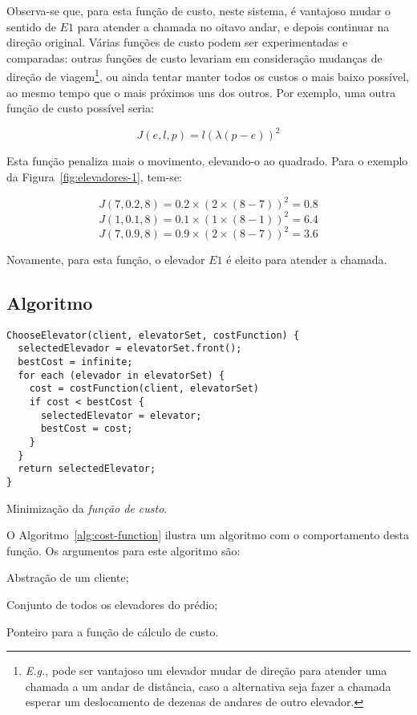 Observa-se que, para esta função de custo, neste sistema, é vantajoso mudar o
sentido de $E1$ para atender a chamada no oitavo andar, e depois continuar na
direção original. Várias funções de custo podem ser experimentadas e comparadas:
outras funções de custo levariam em consideração mudanças de direção de
viagem\footnote{\textit{E.g.}, pode ser vantajoso um elevador mudar de direção
para atender uma chamada a um andar de distância, caso a alternativa seja fazer a
chamada esperar um deslocamento de dezenas de andares de outro elevador.}, ou
ainda tentar manter todos os custos o mais baixo possível, ao mesmo tempo que o
mais próximos uns dos outros. Por exemplo, uma outra função de custo possível
seria:

\[J(e, l, p) = l(\lambda(p - e))^{2}\]

Esta função penaliza mais o movimento, elevando-o ao quadrado. Para o exemplo da
Figura~\ref{fig:elevadores-1}, tem-se:

\[J(7, 0.2, 8) = 0.2 \times (2 \times (8-7))^2 = 0.8\]
\[J(1, 0.1, 8) = 0.1 \times (1 \times (8-1))^2 = 6.4\]
\[J(7, 0.9, 8) = 0.9 \times (2 \times (8-7))^2 = 3.6\]

Novamente, para esta função, o elevador $E1$ é eleito para atender a chamada.

\subsection{Algoritmo}

\begin{algorithm}[htb!]
  \centering
    \begin{verbatim}
ChooseElevator(client, elevatorSet, costFunction) {
  selectedElevador = elevatorSet.front();
  bestCost = infinite;
  for each (elevador in elevatorSet) {
    cost = costFunction(client, elevatorSet)
    if cost < bestCost {
      selectedElevator = elevator;
      bestCost = cost;
    }
  }
  return selectedElevator;
}
    \end{verbatim}
  \caption{\label{alg:cost-function}Minimização da \textit{função de custo}.}
\end{algorithm}


O Algoritmo~\ref{alg:cost-function} ilustra um algoritmo com o comportamento desta
função. Os argumentos para este algoritmo são:

\begin{description}[leftmargin=!,labelwidth=\widthof{\bfseries $costFunction$}]
  \item[$client$] Abstração de um cliente;
  \item[$elevatorset$] Conjunto de todos os elevadores do prédio;
  \item[$costFunction$] Ponteiro para a função de cálculo de custo.
\end{description}

